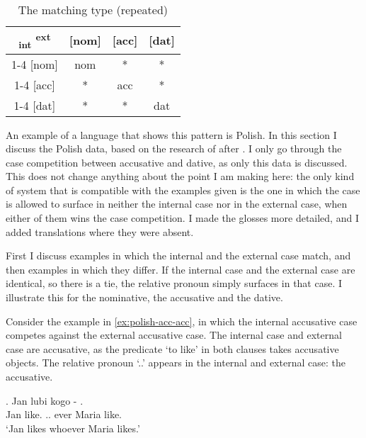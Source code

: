 \begin{table}[ht]
  \center
  \caption{The matching type (repeated)}
  \begin{tabular}{c|c|c|c}
    \toprule
    \textsubscript{\ac{int}} \textsuperscript{\ac{ext}}
           & [\ac{nom}]
           & [\ac{acc}]
           & [\ac{dat}]
           \\ \cmidrule{1-4}
       [\ac{nom}]
           & \ac{nom}
           & *
           & *
           \\ \cmidrule{1-4}
       [\ac{acc}]
           & *
           & \ac{acc}
           & *
           \\ \cmidrule{1-4}
       [\ac{dat}]
           & *
           & *
           & \ac{dat}
           \\
     \bottomrule
  \end{tabular}
    \label{tbl:case-competition-none-repeated}
\end{table}

An example of a language that shows this pattern is Polish. In this section I discuss the Polish data, based on the research of \citet{citko2013} after \citet{himmelreich2017}. I only go through the case competition between accusative and dative, as only this data is discussed. This does not change anything about the point I am making here: the only kind of system that is compatible with the examples given is the one in which the case is allowed to surface in neither the internal case nor in the external case, when either of them wins the case competition. I made the glosses more detailed, and I added translations where they were absent.

First I discuss examples in which the internal and the external case match, and then examples in which they differ. If the internal case and the external case are identical, so there is a tie, the relative pronoun simply surfaces in that case. I illustrate this for the nominative, the accusative and the dative.

Consider the example in \ref{ex:polish-acc-acc}, in which the internal accusative case competes against the external accusative case.
The internal case and external case are accusative, as the predicate  `to like' in both clauses takes accusative objects.
The relative pronoun  `..' appears in the internal and external case: the accusative.

\exg. Jan lubi kogo -  .\\
 Jan like.\scsub{[acc]} .. ever Maria like.\scsub{[acc]}\\
 `Jan likes whoever Maria likes.' \label{ex:polish-acc-acc}

